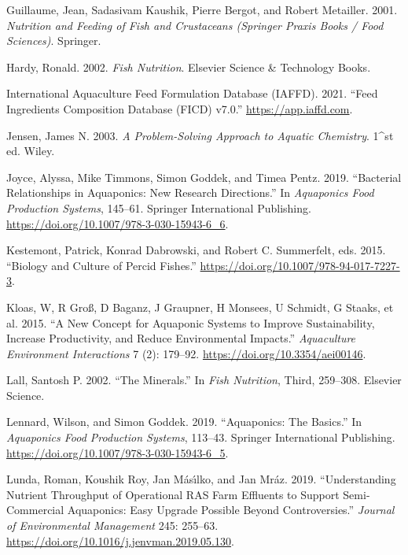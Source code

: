 \documentclass[
]{article}
\newlength{\cslhangindent}
\newlength{\cslentryspacingunit} %
\newenvironment{CSLReferences}[2] %
 {%
  \setlength{\parindent}{0pt}
  \ifodd #1
  \let\oldpar\par
  \def\par{\hangindent=\cslhangindent\oldpar}
  \fi
  \setlength{\parskip}{#2\cslentryspacingunit}
 }%
 {}
\begin{document}
\begin{CSLReferences}{1}{0}
\leavevmode{}%
Guillaume, Jean, Sadasivam Kaushik, Pierre Bergot, and Robert Metailler. 2001. \emph{Nutrition and Feeding of Fish and Crustaceans (Springer Praxis Books / Food Sciences)}. Springer.

\leavevmode{}%
Hardy, Ronald. 2002. \emph{Fish Nutrition}. Elsevier Science \& Technology Books.

\leavevmode{}%
International Aquaculture Feed Formulation Database (IAFFD). 2021. {``{Feed Ingredients Composition Database (FICD) v7.0}.''} \url{https://app.iaffd.com}.

\leavevmode{}%
Jensen, James N. 2003. \emph{A Problem-Solving Approach to Aquatic Chemistry}. 1\^{}st ed. Wiley.

\leavevmode{}%
Joyce, Alyssa, Mike Timmons, Simon Goddek, and Timea Pentz. 2019. {``{Bacterial Relationships in Aquaponics: New Research Directions}.''} In \emph{Aquaponics Food Production Systems}, 145--61. Springer International Publishing. \url{https://doi.org/10.1007/978-3-030-15943-6_6}.

\leavevmode{}%
Kestemont, Patrick, Konrad Dabrowski, and Robert C. Summerfelt, eds. 2015. {``Biology and Culture of Percid Fishes.''} \url{https://doi.org/10.1007/978-94-017-7227-3}.

\leavevmode{}%
Kloas, W, R Groß, D Baganz, J Graupner, H Monsees, U Schmidt, G Staaks, et al. 2015. {``A New Concept for Aquaponic Systems to Improve Sustainability, Increase Productivity, and Reduce Environmental Impacts.''} \emph{Aquaculture Environment Interactions} 7 (2): 179--92. \url{https://doi.org/10.3354/aei00146}.

\leavevmode{}%
Lall, Santosh P. 2002. {``{The Minerals}.''} In \emph{Fish Nutrition}, Third, 259--308. Elsevier Science.

\leavevmode{}%
Lennard, Wilson, and Simon Goddek. 2019. {``{Aquaponics: The Basics}.''} In \emph{Aquaponics Food Production Systems}, 113--43. Springer International Publishing. \url{https://doi.org/10.1007/978-3-030-15943-6_5}.

\leavevmode{}%
Lunda, Roman, Koushik Roy, Jan Másı́lko, and Jan Mráz. 2019. {``Understanding Nutrient Throughput of Operational {RAS} Farm Effluents to Support Semi-Commercial Aquaponics: Easy Upgrade Possible Beyond Controversies.''} \emph{Journal of Environmental Management} 245: 255--63. \url{https://doi.org/10.1016/j.jenvman.2019.05.130}.


\end{CSLReferences}
\end{document}
